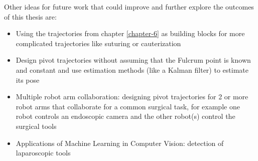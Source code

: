 Other ideas for future work that could improve and further explore the outcomes of this thesis are:
\begin{itemize}
\item Using the trajectories from chapter \ref{chapter-6} as building blocks for more complicated trajectories like suturing or cauterization
\item Design pivot trajectories without assuming that the Fulcrum point is known and constant and use estimation methods (like a Kalman filter) to estimate its pose
\item Multiple robot arm collaboration: designing pivot trajectories for 2 or more robot arms that collaborate for a common surgical task, for example one robot controls an endoscopic camera and the other robot(s) control the
surgical tools
\item Applications of Machine Learning in Computer Vision: detection of laparoscopic tools
\end{itemize}
